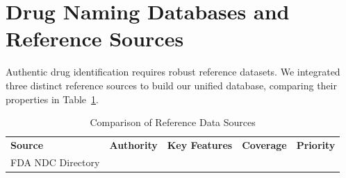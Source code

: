 \documentclass[12pt,a4paper,oneside]{report}
\begin{document}
\section{Drug Naming Databases and Reference
Sources}\label{drug-naming-databases-and-reference-sources}

Authentic drug identification requires robust reference datasets. We
integrated three distinct reference sources to build our unified
database, comparing their properties in Table~\ref{tab:table2}.

\begin{longtable}[]{@{}
  >{\raggedright\arraybackslash}p{}
  >{\raggedright\arraybackslash}p{}
  >{\raggedright\arraybackslash}p{}
  >{\raggedright\arraybackslash}p{}
  >{\raggedright\arraybackslash}p{}@{}}
\caption{Comparison of Reference Data Sources\label{tab:table2}}\\

\toprule\noalign{}
\begin{minipage}[b]{\linewidth}\raggedright

\textbf{Source}

\end{minipage} & \begin{minipage}[b]{\linewidth}\raggedright

\textbf{Authority}

\end{minipage} & \begin{minipage}[b]{\linewidth}\raggedright

\textbf{Key Features}

\end{minipage} & \begin{minipage}[b]{\linewidth}\centering
\textbf{Coverage}
\end{minipage} & \begin{minipage}[b]{\linewidth}\centering
\textbf{Priority}
\end{minipage} \\
\begin{minipage}[b]{\linewidth}\raggedright

FDA NDC Directory

\end{minipage} & \begin{minipage}[b]{\linewidth}\raggedright


\end{minipage}
\end{longtable}
\end{document}
